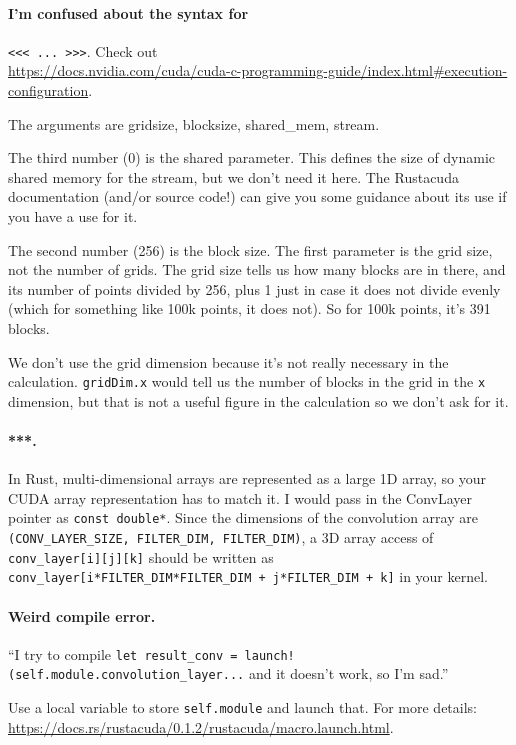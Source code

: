 \paragraph{I'm confused about the syntax for}\verb+<<< ... >>>+. Check out\\
\url{https://docs.nvidia.com/cuda/cuda-c-programming-guide/index.html#execution-configuration}.

The arguments are gridsize, blocksize, shared\_mem, stream.

The third number (0) is the shared parameter. This defines the size of dynamic shared memory for the stream, but we don’t need it here. The Rustacuda documentation (and/or source code!) can give you some guidance about its use if you have a use for it.

The second number (256) is the block size. The first parameter is the grid size, not the number of grids. The grid size tells us how many blocks are in there, and its number of points divided by 256, plus 1 just in case it does not divide evenly (which for something like 100k points, it does not). So for 100k points, it’s 391 blocks.

We don't use the grid dimension because it's not really necessary in the calculation. \texttt{gridDim.x} would tell us the number of blocks in the grid in the \texttt{x} dimension, but that is not a useful figure in the calculation so we don't ask for it.

\paragraph{***.} In Rust, multi-dimensional arrays are represented as a large 1D array, so your CUDA array representation has to match it. I would pass in the ConvLayer pointer as \texttt{const double*}. Since the dimensions of the convolution array are \texttt{(CONV\_LAYER\_SIZE, FILTER\_DIM, FILTER\_DIM)}, a 3D array access of \texttt{conv\_layer[i][j][k]} should be written as \texttt{conv\_layer[i*FILTER\_DIM*FILTER\_DIM + j*FILTER\_DIM + k]} in your kernel.

\paragraph{Weird compile error.} ``I try to compile \verb+let result_conv = launch!(self.module.convolution_layer...+ and it doesn't work, so I'm sad.''

Use a local variable to store \texttt{self.module} and launch that. For more details: \url{https://docs.rs/rustacuda/0.1.2/rustacuda/macro.launch.html}.

